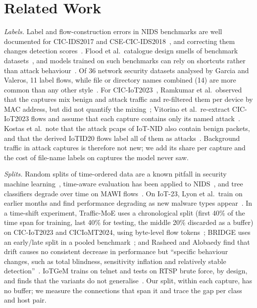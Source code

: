 \section{Related Work}\label{sec:related}

\emph{Labels.} Label and flow-construction errors in NIDS benchmarks are well documented for CIC-IDS2017 and CSE-CIC-IDS2018~\cite{engelen2021troubleshooting,liu2022error}, and correcting them changes detection scores~\cite{lanvin2023errors}. Flood et al.\ catalogue design smells of benchmark datasets~\cite{flood2024smells}, and models trained on such benchmarks can rely on shortcuts rather than attack behaviour~\cite{jacobs2022emperor}. Of 36 network security datasets analysed by Garcia and Valeros, 11 label flows, while file or directory names combined (14) are more common than any other style~\cite{garcia2023labeling}. For CIC-IoT2023~\cite{neto2023ciciot2023}, Ramkumar et al.\ observed that the captures mix benign and attack traffic and re-filtered them per device by MAC address, but did not quantify the mixing~\cite{ramkumar2024diagnosing}; Vitorino et al.\ re-extract CIC-IoT2023 flows and assume that each capture contains only its named attack~\cite{vitorino2025revisiting}. Kostas et al.\ note that the attack pcaps of IoT-NID also contain benign packets, and that the derived IoTID20 flows label all of them as attacks~\cite[App.~A.3]{kostas2024iotgem}. Background traffic in attack captures is therefore not new; we add its share per capture and the cost of file-name labels on captures the model never saw.

\emph{Splits.} Random splits of time-ordered data are a known pitfall in security machine learning~\cite{arp2022dos,pendlebury2019tesseract,apruzzese2023sok}, time-aware evaluation has been applied to NIDS~\cite{andresini2021insomnia}, and tree classifiers degrade over time on MAWI flows~\cite{schraven2026mawiflow}. On IoT-23, Lyon et al.\ train on earlier months and find performance degrading as new malware types appear~\cite{lyon2026iot23drift}. In a time-shift experiment, Traffic-MoE uses a chronological split (first 40\% of the time span for training, last 40\% for testing, the middle 20\% discarded as a buffer) on CIC-IoT2023 and CICIoMT2024, using byte-level flow tokens~\cite{zhou2026trafficmoe}; BRIDGE uses an early/late split in a pooled benchmark~\cite{bridge2026tchnet}; and Rasheed and Alobaedy find that drift causes no consistent decrease in performance but ``specific behaviour changes, such as total blindness, sensitivity inflation and relatively stable detection''~\cite{rasheed2026drift}. IoTGeM trains on telnet and tests on RTSP brute force, by design, and finds that the variants do not generalise~\cite{kostas2024iotgem}. Our split, within each capture, has no buffer; we measure the connections that span it and trace the gap per class and host pair.


